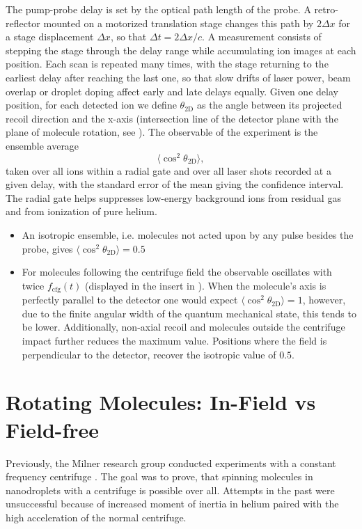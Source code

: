 The pump-probe delay is set by the optical path length of the probe. A retro-reflector mounted on a motorized translation stage changes this path by $2\Delta x$ for a stage displacement $\Delta x$, so that $\Delta t = 2\Delta x/c$. A measurement consists of stepping the stage through the delay range while accumulating ion images at each position. Each scan is repeated many times, with the stage returning to the earliest delay after reaching the last one, so that slow drifts of laser power, beam overlap or droplet doping affect early and late delays equally.
Given one delay position, for each detected ion we define $\theta_{\mathrm{2D}}$ as the angle between its projected recoil direction and the x-axis (intersection line of the detector plane with the plane of molecule rotation, see ). The observable of the experiment is the ensemble average
\begin{equation}
   \langle\cos^2\theta_\mathrm{2D}\rangle,
\end{equation}
taken over all ions within a radial gate and over all laser shots recorded at a given delay, with the standard error of the mean giving the confidence interval. The radial gate helps suppresses low-energy background ions from residual gas and from ionization of pure helium.
\begin{itemize}
    \item  An isotropic ensemble, i.e. molecules not acted upon by any pulse besides the probe, gives $\langle\cos^2\theta_\mathrm{2D}\rangle = 0.5$
    \item For molecules following the centrifuge field the observable oscillates with twice $f_{\mathrm{cfg}}(t)$ (displayed in the insert in ). When the molecule's axis is perfectly parallel to the detector one would expect $\langle\cos^2\theta_\mathrm{2D}\rangle = 1$, however, due to the finite angular width of the quantum mechanical state, this tends to be lower. Additionally, non-axial recoil and molecules outside the centrifuge impact further reduces the maximum value. Positions where the field is perpendicular to the detector, recover the isotropic value of $0.5$.
\end{itemize}

\section{Rotating Molecules: In-Field vs Field-free}
\label{sec:rotating_molecules}
Previously, the Milner research group conducted experiments with a constant frequency centrifuge \cite{macphail-bartleyControlMolecularRotation2026a}. The goal was to prove, that spinning molecules in nanodroplets with a centrifuge is possible over all. Attempts in the past were unsuccessful because of increased moment of inertia in helium paired with the high acceleration of the normal centrifuge. 

